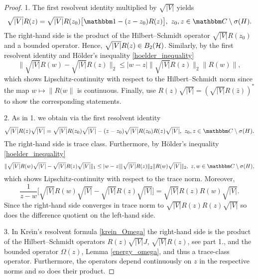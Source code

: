 \begin{proof}
1.
The first resolvent identity multiplied by $\sqrt{|V|}$ yields
\begin{equation*}
  \sqrt{|V|}R(z) = \sqrt{|V|}R(z_0)\big[\id  - (z-z_0) R(z)\big],\ z_0,z\in\C\setminus\sigma(H) .
\end{equation*}
The right-hand side is the product of the Hilbert--Schmidt operator $\sqrt{|V|}R(z_0)$ 
and a bounded operator. Hence, $\sqrt{|V|}R(z)\in B_2({\mathcal H})$. 
Similarly, by the first resolvent identity and H\"older's inequality \eqref{hoelder_inequality}
\begin{equation*}
  \|\sqrt{|V|}R(w) - \sqrt{|V|}R(z)\|_2 \leq |w-z| \|\sqrt{|V|}R(z)\|_2 \|R(w)\| ,
\end{equation*}
which shows Lipschitz-continuity with respect to  the Hilbert--Schmidt norm since the map $w\mapsto\|R(w\|$ is continuous.
Finally, use $R(z)\sqrt{|V|}=(\sqrt{|V|}R(\bar z))^*$ to show the corresponding statements.

2.
As in 1. we obtain via the first resolvent identity
\begin{equation*}
  \sqrt{|V|}R(z)\sqrt{|V|} = \sqrt{|V|}R(z_0)\sqrt{|V|} - (z-z_0) \sqrt{|V|}R(z_0)R(z)\sqrt{|V|},\ 
     z_0,z\in\C\setminus\sigma(H) .
\end{equation*}
The right-hand side is trace class. Furthermore, by H\"older's inequality \eqref{hoelder_inequality}
\begin{equation*}
  \|\sqrt{|V|}R(w)\sqrt{|V|} - \sqrt{|V|}R(z)\sqrt{|V|}\|_1 \leq  |w-z| \| \sqrt{|V|}R(z)\|_2 \|R(w)\sqrt{|V|}\|_2 ,\
     z,w\in\C\setminus\sigma(H),
\end{equation*}
which shows Lipschitz-continuity with respect to the trace norm.  Moreover,
\begin{equation*}
  \frac{1}{z-w}\big[ \sqrt{|V|}R(w)\sqrt{|V|} - \sqrt{|V|}R(z)\sqrt{|V|}\big] 
    = \sqrt{|V|}R(z)R(w)\sqrt{|V|} .
\end{equation*}
Since the right-hand side converges in trace norm to $\sqrt{|V|}R(z)R(z)\sqrt{|V|}$ so does the difference
quotient on the left-hand side.

3.
In Kre\u\i{}n's resolvent formula \eqref{krein_Omega} the right-hand side is the
product of the Hilbert--Schmidt operators $R(z)\sqrt{|V|}J$, $\sqrt{|V|}R(z)$, see part 1.,
and the bounded operator $\Omega(z)$, Lemma \ref{energy_omega},
and thus a trace-class operator. Furthermore, the operators depend continuously on $z$ in the respective
norms and so does their product.
\end{proof}

